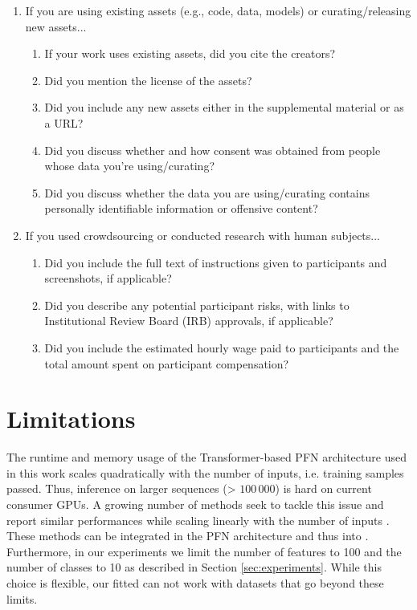 \documentclass{article}
\begin{document}
\begin{enumerate}
\item If you are using existing assets (e.g., code, data, models) or curating/releasing new assets...
\begin{enumerate}
  \item If your work uses existing assets, did you cite the creators?
  \item Did you mention the license of the assets?
  \item Did you include any new assets either in the supplemental material or as a URL?
    \answerNA{}
  \item Did you discuss whether and how consent was obtained from people whose data you're using/curating?
    \answerNA{}
  \item Did you discuss whether the data you are using/curating contains personally identifiable information or offensive content?
    \answerNA{}
\end{enumerate}


\item If you used crowdsourcing or conducted research with human subjects...
\begin{enumerate}
  \item Did you include the full text of instructions given to participants and screenshots, if applicable?
    \answerNA{}
  \item Did you describe any potential participant risks, with links to Institutional Review Board (IRB) approvals, if applicable?
    \answerNA{}
  \item Did you include the estimated hourly wage paid to participants and the total amount spent on participant compensation?
    \answerNA{}
\end{enumerate}


\end{enumerate}
\fi



\newpage
\appendix

\section{Limitations}
\label{sec:limitations}
The runtime and memory usage of the Transformer-based PFN architecture used in this work scales quadratically with the number of inputs, i.e. training samples passed. Thus, inference on larger sequences (> $100\,000$) is hard on current consumer GPUs. A growing number of methods seek to tackle this issue and report similar performances while scaling linearly with the number of inputs \citep{zaheer2020big, beltagy2020longformer}. These methods can be integrated in the PFN architecture and thus into \methodname{}.
Furthermore, in our experiments we limit the number of features to 100 and the number of classes to 10 as described in Section \ref{sec:experiments}. While this choice is flexible, our fitted \methodname{} can not work with datasets that go beyond these limits.
\end{document}
